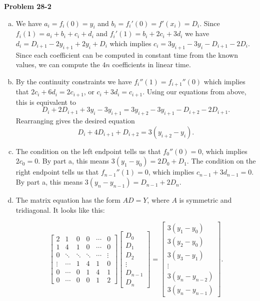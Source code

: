 \documentclass{article}
\begin{document}
\noindent\textbf{Problem 28-2}\\

\begin{enumerate}[a.]
\item We have $a_i = f_i(0) = y_i$ and $b_i = f_i'(0) = f'(x_i) = D_i$.  Since $f_i(1) = a_i + b_i + c_i + d_i$ and $f_i'(1) = b_i + 2c_i + 3d_i$ we have $d_i = D_{i+1} - 2y_{i+1} + 2y_i + D_i$ which implies $c_i = 3y_{i+1} - 3 y_i - D_{i+1} - 2D_i$. Since each coefficient can be computed in constant time from the known values, we can compute the $4n$ coefficients in linear time.  

\item By the continuity constraints we have $f_i''(1) = f_{i+1}''(0)$ which implies that $2c_i + 6d_i = 2c_{i+1}$, or $c_i + 3d_i = c_{i+1}$. Using our equations from above, this is equivalent to 
\[ D_i + 2D_{i+1} + 3y_i - 3y_{i+1} = 3y_{i+2} - 3y_{i+1} - D_{i+2} - 2D_{i+1}.\]
Rearranging gives the desired equation
\[ D_i + 4D_{i+1} + D_{i+2} = 3(y_{i+2} - y_i).\]

\item The condition on the left endpoint tells us that $f_0''(0) = 0$, which implies $2c_0 = 0$.  By part a, this means $3(y_1-y_0) = 2D_0 + D_1$.  The condition on the right endpoint tells us that $f_{n-1}''(1) = 0$, which implies $c_{n-1} + 3d_{n-1} = 0$.  By part a, this means $3(y_n - y_{n-1}) = D_{n-1} + 2D_n$. 

\item The matrix equation has the form $AD = Y$, where $A$ is symmetric and tridiagonal.  It looks like this:

\[ \left[ \begin{array}{cccccc} 2&1&0&0&\cdots&0\\1&4&1&0&\cdots&0\\ 0&\ddots&\ddots&\ddots&\cdots&\vdots\\ \vdots&\cdots&1&4&1&0\\
0&\cdots&0&1&4&1\\0&\cdots&0&0&1&2 \end{array}\right]
\left[ \begin{array}{c} D_0 \\ D_1 \\ D_2 \\ \vdots \\ D_{n-1} \\ D_{n} \end{array}\right] = 
\left[ \begin{array}{c} 3(y_1 - y_0) \\ 3(y_2 - y_0) \\ 3(y_3 - y_1) \\ \vdots \\ 3(y_n - y_{n-2}) \\ 3(y_n - y_{n-1}) \end{array} \right]
.\]


\end{enumerate}
\end{document}
